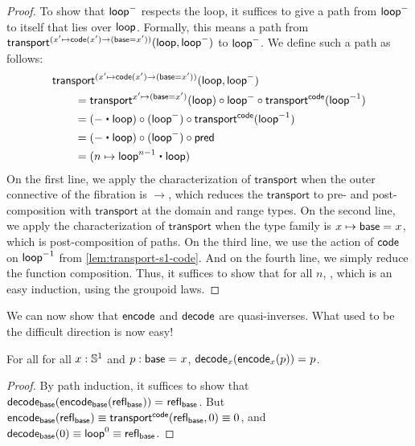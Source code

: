 \begin{proof}
To show that $\mathsf{loop}^-$ respects the loop, it suffices to give a path
from $\mathsf{loop}^-$ to itself that lies over $\mathsf{loop}$. 
Formally, this means a path from $\mathsf{transport}^{(x' \mapsto \mathsf{code}(x')
\rightarrow (\mathsf{base}=x'))}(\mathsf{loop},\mathsf{loop}^-)$ to $\mathsf{loop}^-$.  We define such a
path as follows:
\begin{align*}
  \MoveEqLeft \transfib {(x' \mapsto \code(x') \rightarrow (\base=x'))} \lloop {\lloop^-}\\
&= \transfibf {x'\mapsto (\base=x')}(\lloop) \circ {\lloop^-} \circ \transfibf \code ({\opp \lloop}) \\
&= (- \ct \lloop) \circ (\lloop^-) \circ \transfibf \code ({\opp \lloop}) \\
&= (- \ct \lloop) \circ (\lloop^-) \circ \Zpred \\
&= (n \mapsto \lloop^{n - 1} \ct \lloop)                 
\end{align*}
On the first line, we apply the characterization of $\mathsf{transport}$
when the outer connective of the fibration is $\rightarrow$, which
reduces the $\mathsf{transport}$ to pre- and post-composition with
$\mathsf{transport}$ at the domain and range types.  On the second line,
we apply the characterization of $\mathsf{transport}$ when the type family
is $x\mapsto \mathsf{base} =_{} x$, which is post-composition of paths.  On the third line,
we use the action of $\mathsf{code}$ on $\mathord{{\mathsf{loop}}^{-1}}$ from
\autoref{lem:transport-s1-code}.  And on the fourth line, we simply
reduce the function composition.  Thus, it suffices to show that for all
$n$, , which is an easy
induction, using the groupoid laws.  
\end{proof}

We can now show that $\mathsf{encode}$ and $\mathsf{decode}$ are quasi-inverses.
What used to be the difficult direction is now easy!

\begin{lem} \label{lem:s1-decode-encode}  For all 
for all $x: \mathbb{S} ^1$ and $p : \mathsf{base} =_{} x$, $\mathsf{decode}_x({{\mathsf{encode}_x(p)}}) =_{} p$.  
\end{lem}

\begin{proof}
By path induction, it suffices to show that 
$\mathsf{decode}_{\mathsf{base}}({{\mathsf{encode}_{\mathsf{base}}(\mathsf{refl}_{\mathsf{base}})}}) =_{} \mathsf{refl}_{\mathsf{base}}$.
But
${\mathsf{encode}_{\mathsf{base}}(\mathsf{refl}_{\mathsf{base}})} \equiv 
 \mathsf{transport}^{\mathsf{code}}(\mathsf{refl}_{\mathsf{base}},0) \equiv 0$, and $\mathsf{decode}_{\mathsf{base}}(0)
 \equiv \mathsf{loop}^ 0 \equiv \mathsf{refl}_{\mathsf{base}}$.  
\end{proof}

